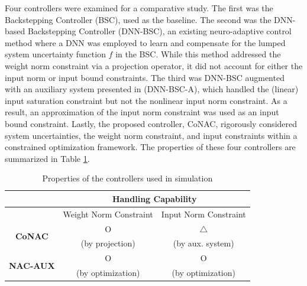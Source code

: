 \documentclass[lettersize,journal]{IEEEtran}
\begin{document}
Four controllers were examined for a comparative study. The first was the Backstepping Controller (BSC), used as the baseline. The second was the DNN-based Backstepping Controller (DNN-BSC), an existing neuro-adaptive control method where a DNN was employed to learn and compensate for the lumped system uncertainty function $f$ in the BSC. While this method addressed the weight norm constraint via a projection operator, it did not account for either the input norm or input bound constraints. The third was DNN-BSC augmented with an auxiliary system presented in \cite{Esfandiari:2014aa,Karason:1994aa,Esfandiari:2015aa} (DNN-BSC-A), which handled the (linear) input saturation constraint but not the nonlinear input norm constraint. As a result, an approximation of the input norm constraint was used as an input bound constraint. Lastly, the proposed controller, CoNAC, rigorously considered system uncertainties, the weight norm constraint, and input constraints within a constrained optimization framework. The properties of these four controllers are summarized in Table \ref{table:controller}.

\begin{table}[!t]
    \renewcommand{\arraystretch}{1.3}
    \caption{Properties of the controllers used in simulation}
    \label{table:controller}
    \centering
    \begin{tabular}{c c c}
    \hline
    & \multicolumn{2}{c}{\bf{Handling Capability}}\\
    \hline
    \hline
    & Weight Norm Constraint & Input Norm Constraint\\
    \hline
    \hline
    \multirow{2}{*}{\bf{CoNAC}} & O & $\triangle$ \\
       & (by projection) &  (by aux. system)\\
    \hline
    \multirow{2}{*}{\bf{NAC-AUX}} & O & O\\
       & (by optimization) & (by optimization)\\
    \hline
    \end{tabular}
\end{table}
\end{document}
